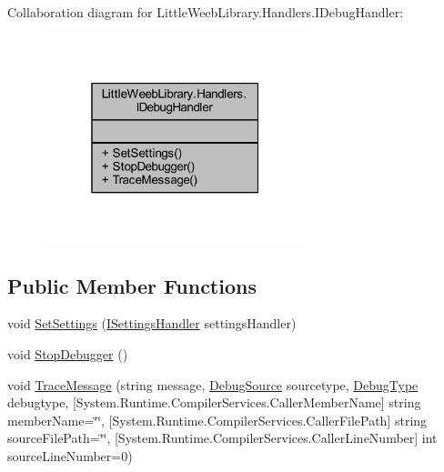 Collaboration diagram for Little\+Weeb\+Library.\+Handlers.\+I\+Debug\+Handler\+:\nopagebreak
\begin{figure}[H]
\begin{center}
\leavevmode
\includegraphics[width=217pt]{interface_little_weeb_library_1_1_handlers_1_1_i_debug_handler__coll__graph}
\end{center}
\end{figure}
\subsection*{Public Member Functions}
\begin{DoxyCompactItemize}
\item 
void \mbox{\hyperlink{interface_little_weeb_library_1_1_handlers_1_1_i_debug_handler_ac94e404b87a0922e0d6a7c7a7bc2a1b5}{Set\+Settings}} (\mbox{\hyperlink{interface_little_weeb_library_1_1_handlers_1_1_i_settings_handler}{I\+Settings\+Handler}} settings\+Handler)
\item 
void \mbox{\hyperlink{interface_little_weeb_library_1_1_handlers_1_1_i_debug_handler_a96c2102206eb5238faa8a07bc9652fd1}{Stop\+Debugger}} ()
\item 
void \mbox{\hyperlink{interface_little_weeb_library_1_1_handlers_1_1_i_debug_handler_a2e405bc3492e683cd3702fae125221bc}{Trace\+Message}} (string message, \mbox{\hyperlink{namespace_little_weeb_library_1_1_handlers_a2a6ca0775121c9c503d58aa254d292be}{Debug\+Source}} sourcetype, \mbox{\hyperlink{namespace_little_weeb_library_1_1_handlers_ab66019ed40462876ec4e61bb3ccb0a62}{Debug\+Type}} debugtype, \mbox{[}System.\+Runtime.\+Compiler\+Services.\+Caller\+Member\+Name\mbox{]} string member\+Name=\char`\"{}\char`\"{}, \mbox{[}System.\+Runtime.\+Compiler\+Services.\+Caller\+File\+Path\mbox{]} string source\+File\+Path=\char`\"{}\char`\"{}, \mbox{[}System.\+Runtime.\+Compiler\+Services.\+Caller\+Line\+Number\mbox{]} int source\+Line\+Number=0)
\end{DoxyCompactItemize}



